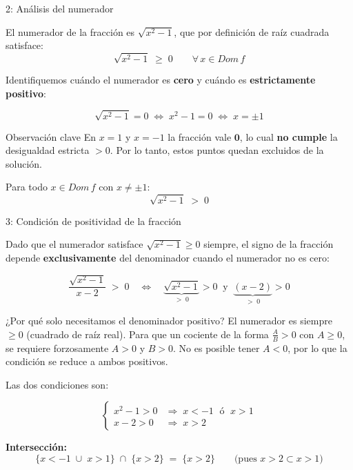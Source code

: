 \documentclass[letterpaper, 12pt]{article}
\begin{document}
\bigskip

\begin{paso}{2: Análisis del numerador}

El numerador de la fracción es $\sqrt{x^2 - 1}$, que por definición de
raíz cuadrada satisface:
\[
    \sqrt{x^2 - 1} \;\geq\; 0 \qquad \forall\, x \in Dom\,f
\]

Identifiquemos cuándo el numerador es \textbf{cero} y cuándo es
\textbf{estrictamente positivo}:

\[
    \sqrt{x^2 - 1} = 0 \;\Longleftrightarrow\; x^2 - 1 = 0
    \;\Longleftrightarrow\; x = \pm 1
\]

\begin{justif}{Observación clave}
    En $x = 1$ y $x = -1$ la fracción vale $\mathbf{0}$, lo cual
    \textbf{no cumple} la desigualdad estricta $> 0$.
    Por lo tanto, estos puntos quedan excluidos de la solución.
\end{justif}

\medskip
Para todo $x \in Dom\,f$ con $x \neq \pm 1$:
\[
    \sqrt{x^2 - 1} \;>\; 0
\]

\end{paso}

\bigskip

\begin{paso}{3: Condición de positividad de la fracción}

Dado que el numerador satisface $\sqrt{x^2-1} \geq 0$ siempre, el signo
de la fracción depende \textbf{exclusivamente} del denominador cuando el
numerador no es cero:

\[
    \dfrac{\sqrt{x^2 - 1}}{x - 2} \;>\; 0
    \quad\Longleftrightarrow\quad
    \underbrace{\sqrt{x^2 - 1}}_{> \;0} > 0
    \;\;\text{y}\;\;
    \underbrace{(x - 2)}_{> \;0} > 0
\]

\begin{justif}{¿Por qué solo necesitamos el denominador positivo?}
    El numerador es siempre $\geq 0$ (cuadrado de raíz real).
    Para que un cociente de la forma $\tfrac{A}{B} > 0$ con $A \geq 0$,
    se requiere forzosamente $A > 0$ y $B > 0$.
    No es posible tener $A < 0$, por lo que la condición se reduce a
    ambos positivos.
\end{justif}

\medskip
Las dos condiciones son:

\[
    \begin{cases}
        x^2 - 1 > 0 & \Longrightarrow\; x < -1 \;\text{ ó }\; x > 1 \\[4pt]
        x - 2 > 0   & \Longrightarrow\; x > 2
    \end{cases}
\]

\textbf{Intersección:}
\[
    \bigl\{x < -1 \;\cup\; x > 1\bigr\}
    \;\cap\;
    \bigl\{x > 2\bigr\}
    \;=\;
    \bigl\{x > 2\bigr\}
    \qquad \text{(pues } x > 2 \subset x > 1 \text{)}
\]

\end{paso}
\end{document}
